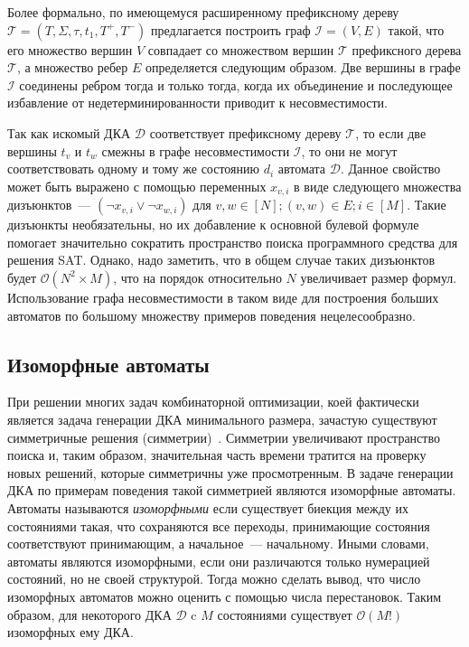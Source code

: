 Более формально, по имеющемуся расширенному префиксному дереву $\mathcal{T} = \left(T,\Sigma,\tau,t_{1},T^{+},T^{-}\right)$ предлагается построить граф $\mathcal{I} = \left(V, E\right)$ такой, что его множество вершин $V$ совпадает со множеством вершин $\mathcal{T}$ префиксного дерева $\mathcal{T}$, а множество ребер $E$ определяется следующим образом. 
Две вершины в графе $\mathcal{I}$ соединены ребром тогда и только тогда, когда их объединение и последующее избавление от недетерминированности приводит к несовместимости. 

Так как искомый ДКА $\mathcal{D}$ соответствует префиксному дереву $\mathcal{T}$, то если две вершины $t_{v}$ и $t_{w}$ смежны в графе несовместимости $\mathcal{I}$, то они не могут соответствовать одному и тому же состоянию $d_{i}$ автомата $\mathcal{D}$.
Данное свойство может быть выражено с помощью переменных $x_{v,i}$ в виде следующего множества дизъюнктов~{---} $\left(\neg x_{v,i} \vee \neg x_{w,i}\right)$ для $v,w \in \left[N\right]; \left(v,w\right) \in E; i \in \left[M\right]$.
Такие дизъюнкты необязательны, но их добавление к основной булевой формуле помогает значительно сократить пространство поиска программного средства для решения SAT. 
Однако, надо заметить, что в общем случае таких дизъюнктов будет $\mathcal{O}\left(N^{2} \times M\right)$, что на порядок относительно $N$ увеличивает размер формул. 
Использование графа несовместимости в таком виде для построения больших автоматов по большому множеству примеров поведения нецелесообразно. 

\subsection{Изоморфные автоматы}
\label{sec:review:sym-breaking:isomorphic-automata}


При решении многих задач комбинаторной оптимизации, коей фактически является задача генерации ДКА минимального размера, зачастую существуют симметричные решения (симметрии)~\cite{DBLP:conf/aaai/Walsh12}.
Симметрии увеличивают пространство поиска и, таким образом, значительная часть времени тратится на проверку новых решений, которые симметричны уже просмотренным.
В задаче генерации ДКА по примерам поведения такой симметрией являются изоморфные автоматы.
Автоматы называются \emph{изоморфными} если существует биекция между их состояниями такая, что сохраняются все переходы, принимающие состояния соответствуют принимающим, а начальное~--- начальному.
Иными словами, автоматы являются изоморфными, если они различаются только нумерацией состояний, но не своей структурой.
Тогда можно сделать вывод, что число изоморфных автоматов можно оценить с помощью числа перестановок.
Таким образом, для некоторого ДКА $\mathcal{D}$ c $M$ состояниями существует $\mathcal{O}\left(M!\right)$ изоморфных ему ДКА.

